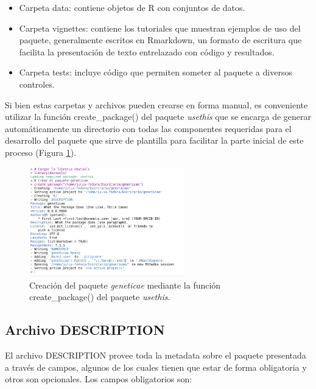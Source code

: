 \begin{itemize}
\item Carpeta data: contiene objetos de R con conjuntos de datos.
\item Carpeta vignettes: contiene los tutoriales que muestran ejemplos de uso del paquete, generalmente escritos en Rmarkdown, un formato de escritura que
facilita la presentación de texto entrelazado con código y resultados.
\item Carpeta tests: incluye código que permiten someter al paquete a diversos controles.
\end{itemize}

Si bien estas carpetas y archivos pueden crearse en forma manual, es conveniente utilizar la función \textcolor{fandango}{create\_package()} del paquete \emph{usethis} que se encarga de generar automáticamente un directorio con todas las componentes requeridas para el desarrollo del paquete que sirve de plantilla para facilitar la parte inicial de este proceso (Figura \ref{fig:fig32}). 

\begin{figure}[h]
	\begin{center}
		\includegraphics[width=0.60\textwidth]{./Graficos/creacion.png}	
	\end{center}
	\caption{Creación del paquete \emph{geneticae} mediante la función \textcolor{fandango}{create\_package()} del paquete \emph{usethis}.}
	\label{fig:fig32}
\end{figure}


\subsection{Archivo DESCRIPTION}
\label{subsec:description}
El archivo DESCRIPTION provee toda la metadata sobre el paquete presentada a través de campos, algunos de los cuales tienen que estar de forma obligatoria y otros son opcionales. Los campos obligatorios son: 

